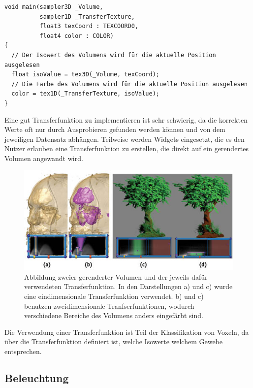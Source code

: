 \begin{verbatim}
void main(sampler3D _Volume,
          sampler1D _TransferTexture,
          float3 texCoord : TEXCOORD0,
          float4 color : COLOR)
{
  // Der Isowert des Volumens wird für die aktuelle Position ausgelesen
  float isoValue = tex3D(_Volume, texCoord);
  // Die Farbe des Volumens wird für die aktuelle Position ausgelesen
  color = tex1D(_TransferTexture, isoValue);
}
\end{verbatim}

Eine gut Transferfunktion zu implementieren ist sehr schwierig, da die korrekten Werte oft nur durch Ausprobieren gefunden werden können und von dem jeweiligen Datensatz abhängen. Teilweise werden Widgets eingesetzt, die es den Nutzer erlauben eine Transferfunktion zu erstellen, die direkt auf ein gerendertes Volumen angewandt wird.

\begin{figure}
	\centering
	\includegraphics[width=0.7\linewidth]{images/transferfunction.jpg}
	\caption{Abbildung zweier gerenderter Volumen und der jeweils dafür verwendeten Transferfunktion. In den Darstellungen a) und c) wurde eine eindimensionale Transferfunktion verwendet. b) und c) benutzen zweidimensionale Tranfserfunktionen, wodurch verschiedene Bereiche des Volumens anders eingefärbt sind. }
	\label{img:phong}
\end{figure}

Die Verwendung einer Transferfunktion ist Teil der Klassifikation von Voxeln, da über die Transferfunktion definiert ist, welche Isowerte welchem Gewebe entsprechen.

\subsection{Beleuchtung}
\label{beleuchtung}

